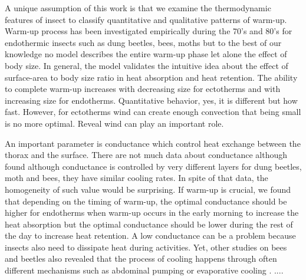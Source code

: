 A unique assumption of this work is that we examine the thermodynamic features of insect to classify quantitative and qualitative patterns of warm-up.
Warm-up process has been investigated empirically during the 70's and 80's for endothermic insects  such as dung beetles, bees, moths \citep{Heinrich1975, Bartholomew1978, Bartholomew1981} but to the best of our knowledge no model describes the entire warm-up phase let alone the effect of body size.
In general, the model validates the intuitive idea about  the effect of surface-area to body size ratio in heat absorption and heat retention.
The ability to complete warm-up increases with decreasing size for ectotherms and with increasing size for endotherms.
Quantitative behavior, yes, it is different but how fast.
However, for ectotherms wind can create enough convection that being small is no more optimal. %
Reveal wind can play an important role.



An important parameter is conductance which control heat exchange between the thorax and the surface.
There are not much data about conductance although  \citet{Bartholomew1978} found although conductance is controlled by very different layers for dung beetles, moth and bees, they have similar cooling rates. %
In spite of that data, the homogeneity of such value would be surprising. %
If warm-up is crucial, we found that depending on the timing of warm-up, the optimal conductance should be higher for endotherms when warm-up occurs in the early morning  to increase the heat absorption but the optimal conductance should be lower during the rest of the day to increase heat retention.
A low conductance  can be a problem because insects also need to dissipate heat during activities.
Yet,  other studies on bees and beetles also revealed that the process of cooling happens through often different mechanisms such as abdominal pumping or evaporative cooling \citep{Heinrich1979, Verdu2012}.
....

